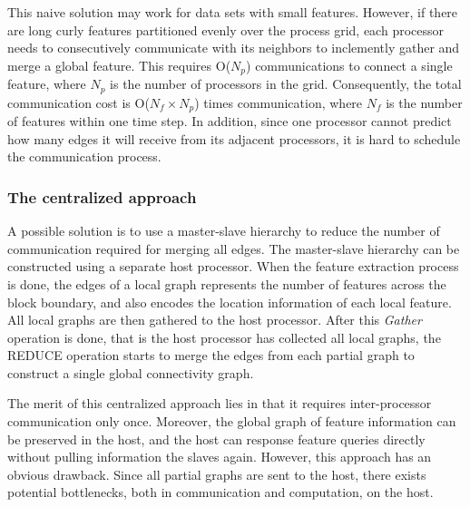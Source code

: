 \documentclass[10pt, conference, compsocconf]{IEEEtran}
\begin{document}
This naive solution may work for data sets with small features. However, if there are long curly features partitioned evenly over the process grid,
each processor needs to consecutively communicate with its neighbors to inclemently gather and merge a global feature. 
This requires O(${N_p}$) communications to connect a single feature, where ${N_p}$ is the number of processors in the grid. Consequently, the total communication cost is O(${N_f \times N_p}$) times communication, where ${N_f}$ is the number of features within one time step. In addition, since one processor cannot predict how many edges it will receive from its adjacent processors, it is hard to schedule the communication process.

\subsubsection{The centralized approach}
A possible solution is to use a master-slave hierarchy to reduce the number of communication required for merging all edges. The master-slave hierarchy can be constructed using a separate host processor. %
When the feature extraction process is done, the edges of a local graph represents the number of features across the block boundary, and also encodes the location information of each local feature. All local graphs are then gathered to the host processor. 
After this \emph{Gather} operation is done, that is the host processor has collected all local graphs, the REDUCE operation starts to merge the edges from each partial graph to construct a single global connectivity graph.

The merit of this centralized approach lies in that it requires inter-processor communication only once. 
Moreover, the global graph of feature information can be preserved in the host, and the host can response feature queries directly without pulling information the slaves again. 
However, this approach has an obvious drawback. Since all partial graphs are sent to the host, there exists potential bottlenecks, both in communication and computation, on the host.  
\end{document}
